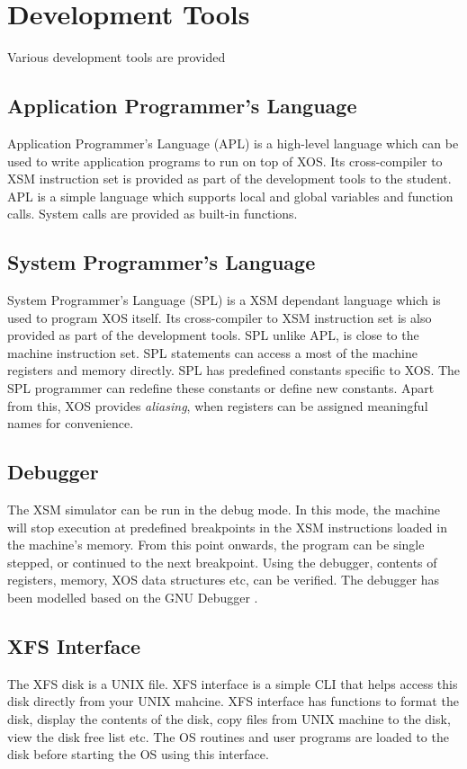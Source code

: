 \documentclass{sig-alternate}
\begin{document}
\section{Development Tools}

Various development tools are provided

\subsection{Application Programmer's Language}
Application Programmer's Language (APL) is a high-level language which can be used to write application programs to run on top of XOS. Its cross-compiler to XSM instruction set is provided as part of the development tools to the student. APL is a simple language which supports local and global variables and function calls. System calls are provided as built-in functions. \\


\subsection{System Programmer's Language}
System Programmer's Language (SPL) is a XSM dependant language which is used to program XOS itself. Its cross-compiler to XSM instruction set is also provided as part of the development tools. SPL unlike APL, is close to the machine instruction set. SPL statements can access a most of the machine registers and memory directly. SPL has predefined constants specific to XOS. The SPL programmer can redefine these constants or define new constants. Apart from this, XOS provides \textit{aliasing}, when registers can be assigned meaningful names for convenience.\\


\subsection{Debugger}
The XSM simulator can be run in the debug mode. In this mode, the machine will stop execution at predefined breakpoints in the XSM instructions loaded in the machine's memory. From this point onwards, the program can be single stepped, or continued to the next breakpoint. Using the debugger, contents of registers, memory, XOS data structures etc, can be verified. The debugger has been modelled based on the GNU Debugger \cite{gdb}.\\


\subsection{XFS Interface}
The XFS disk is a UNIX file. XFS interface is a simple CLI that helps access this disk directly from your UNIX mahcine. XFS interface has functions to format the disk, display the contents of the disk, copy files from UNIX machine to the disk, view the disk free list etc. The OS routines and user programs are loaded to the disk before starting the OS using this interface.\\
\end{document}
